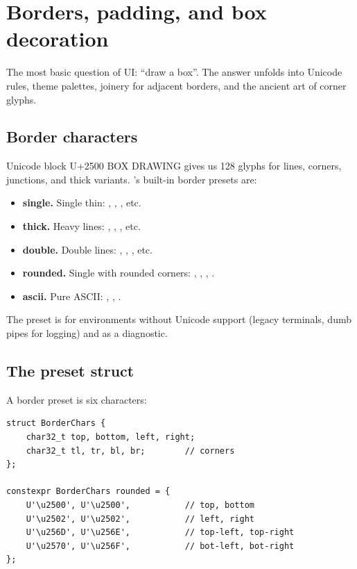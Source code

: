 \chapter{Borders, padding, and box decoration}
\label{ch:borders}

\begin{aside}
The most basic question of UI: ``draw a box''. The answer
unfolds into Unicode rules, theme palettes, joinery for adjacent
borders, and the ancient art of corner glyphs.
\end{aside}

\section{Border characters}

Unicode block U+2500 BOX DRAWING gives us 128 glyphs for lines,
corners, junctions, and thick variants. \maya{}'s built-in
border presets are:

\begin{itemize}[leftmargin=*]
  \item \textbf{single.} Single thin: , ,
    , etc.
  \item \textbf{thick.} Heavy lines: , ,
    , etc.
  \item \textbf{double.} Double lines: ,
    , , etc.
  \item \textbf{rounded.} Single with rounded corners:
    , , , .
  \item \textbf{ascii.} Pure ASCII: \code{+}, \code{-}, \code{|}.
\end{itemize}

The  preset is for environments without Unicode
support (legacy terminals, dumb pipes for logging) and as a
diagnostic.

\section{The preset struct}

A border preset is six characters:

\begin{lstlisting}
struct BorderChars {
    char32_t top, bottom, left, right;
    char32_t tl, tr, bl, br;        // corners
};

constexpr BorderChars rounded = {
    U'\u2500', U'\u2500',           // top, bottom
    U'\u2502', U'\u2502',           // left, right
    U'\u256D', U'\u256E',           // top-left, top-right
    U'\u2570', U'\u256F',           // bot-left, bot-right
};
\end{lstlisting}

